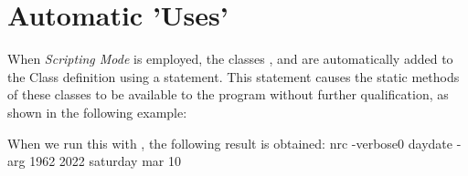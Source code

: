 \section{Automatic 'Uses'}
When \emph{Scripting Mode} is employed, the classes ,  and  are automatically added to the Class definition using a  statement. This statement causes the static methods of these classes to be available to the program without further qualification, as shown in the following example:

When we run this with , the following result is obtained:
\bash[stdout]
nrc -verbose0 daydate -arg 1962 2022 saturday mar 10
\END
